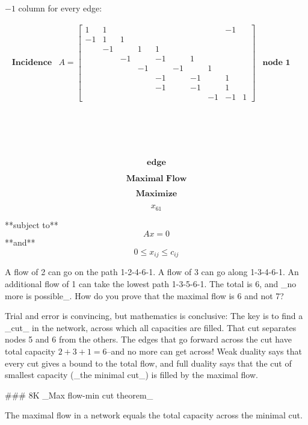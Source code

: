 \(-1\) column for every edge:

\[\begin{array}{ccccccccc}\textbf{ Incidence}&A=\begin{bmatrix}1&1&&&&&&&-1\\ -1&1&1&&&&\\ &-1&&1&1&&&\\ &&-1&&-1&&1&\\ &&&-1&&-1&&1&\\ &&&&-1&&-1&&1&\\ &&&&-1&&-1&&1\\ &&&&&&&-1&-1&1\end{bmatrix}&\textbf{node 1}\\ &&&&\\ &&&&\\ &&&&\\ &&&&\\ &&&&\\ &&&&\\ &&&&\\ &&&&\\ &&&&\\ &&&&\\ &&&&\\ &&&&\\ \end{array}\]

\[\textbf{edge}\]

\[\textbf{Maximal Flow}\]

\[\textbf{Maximize}\]

\[x_{61}\]

**subject to** \[Ax=0\]
**and** \[0\leq x_{ij}\leq c_{ij}\]

A flow of 2 can go on the path 1-2-4-6-1. A flow of 3 can go along 1-3-4-6-1. An additional flow of 1 can take the lowest path 1-3-5-6-1. The total is 6, and _no more is possible_. How do you prove that the maximal flow is 6 and not 7?

Trial and error is convincing, but mathematics is conclusive: The key is to find a _cut_ in the network, across which all capacities are filled. That cut separates nodes 5 and 6 from the others. The edges that go forward across the cut have total capacity \(2+3+1=6\)--and no more can get across! Weak duality says that every cut gives a bound to the total flow, and full duality says that the cut of smallest capacity (_the minimal cut_) is filled by the maximal flow.

### 8K _Max flow-min cut theorem_

The maximal flow in a network equals the total capacity across the minimal cut.

